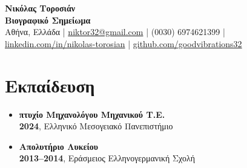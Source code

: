 \documentclass[a4paper,9pt]{extarticle}
\begin{document}
\newcommand{\en}[1]{\selectlanguage{english}\text{#1}\selectlanguage{greek}}
\pagestyle{empty}

\begin{center}
\textbf{\Large Νικόλας Τοροσιάν }\\[3pt] %
\textbf{Βιογραφικό Σημείωμα}\\[1pt] %
Αθήνα, Ελλάδα
| \href{mailto:niktor32@gmail.com}{niktor32@gmail.com} | (0030) 6974621399 | \href{https://www.linkedin.com/in/nikolas-torosian-700235273/}{linkedin.com/in/nikolas-torosian} | \href{https://github.com/goodvibrations32/}{github.com/goodvibrations32}   %
\end{center}


\section*{Εκπαίδευση}

\noindent
\begin{itemize}
  \item{\textbf{πτυχίο Μηχανολόγου Μηχανικού Τ.Ε.}} \\
        \textbf{2024}, Ελληνικό Μεσογειακό Πανεπιστήμιο \\
\noindent
  \item{\textbf{Απολυτήριο Λυκείου}} \\
        \textbf{2013--2014}, Εράσμειος Ελληνογερμανική Σχολή \\
\end{itemize}

\end{document}
